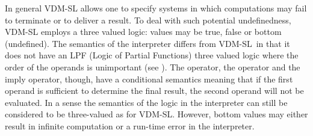 \documentclass[\pformat,12pt]{article}
\newcommand{\vdmslpp}[2]{%
#1
}
\newcommand{\vdmsl}{VDM-SL}
\newcommand{\vdmpp}{VDM++}
\begin{document}
In general \vdmslpp{\vdmsl}{\vdmpp} allows one to specify systems in
which computations may fail to terminate or to deliver a result. To
deal with such potential undefinedness, 
\vdmslpp{\vdmsl}{\vdmpp} employs a three valued logic: values may be
true, false or bottom (undefined). 
The semantics of the interpreter differs from \vdmsl\ in that it does
not have an LPF (Logic of Partial Functions) three valued logic where
the order of the operands is  
unimportant (see \cite{Jones90a}).  The  operator, the
 operator and the imply operator, though, have a conditional
semantics meaning that if the first operand is sufficient to determine
the final result, the second operand will not be evaluated. In a sense
the semantics of the logic in the interpreter can still be considered
to be three-valued as for VDM-SL. However, bottom values may
either result in infinite computation or a run-time error in the
interpreter.
\end{document}
